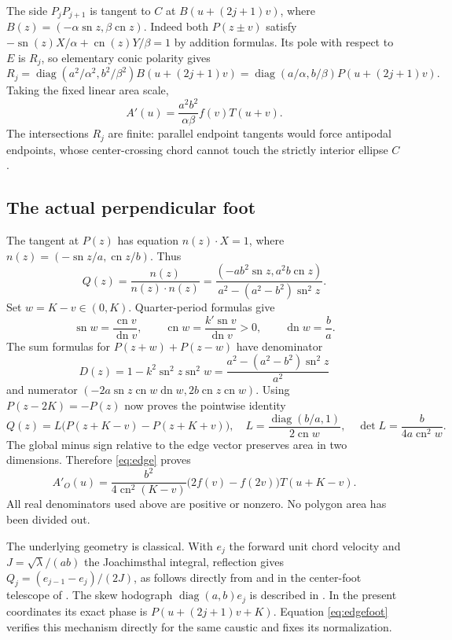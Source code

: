 \documentclass[11pt]{article}
\newcommand{\sn}{\operatorname{sn}}
\newcommand{\cn}{\operatorname{cn}}
\newcommand{\dn}{\operatorname{dn}}
\begin{document}
The side $P_jP_{j+1}$ is tangent to $C$ at
$B(u+(2j+1)v)$, where $B(z)=(-\alpha\sn z,\beta\cn z)$.
Indeed both $P(z\pm v)$ satisfy
$-\sn(z)X/\alpha+\cn(z)Y/\beta=1$ by addition formulas.
Its pole with respect to $E$ is $R_j$, so elementary conic polarity gives
\[
 R_j=\operatorname{diag}(a^2/\alpha^2,b^2/\beta^2)B(u+(2j+1)v)
 =\operatorname{diag}(a/\alpha,b/\beta)P(u+(2j+1)v).
\]
Taking the fixed linear area scale,
\begin{equation}\label{eq:outer}
 A'(u)=\frac{a^2b^2}{\alpha\beta}f(v)T(u+v).
\end{equation}
The intersections $R_j$ are finite: parallel endpoint tangents would force
antipodal endpoints, whose center-crossing chord cannot touch the strictly
interior ellipse $C$.

\subsection*{The actual perpendicular foot}
The tangent at $P(z)$ has equation $n(z)\cdot X=1$, where
$n(z)=(-\sn z/a,\cn z/b)$. Thus
\begin{equation}\label{eq:foot}
 Q(z)=\frac{n(z)}{n(z)\cdot n(z)}
 =\frac{(-ab^2\sn z,a^2b\cn z)}{a^2-(a^2-b^2)\sn^2z}.
\end{equation}
Set $w=K-v\in(0,K)$. Quarter-period formulas give
\[
 \sn w=\frac{\cn v}{\dn v},\qquad
 \cn w=\frac{k'\sn v}{\dn v}>0,\qquad \dn w=\frac ba.
\]
The sum formulas for $P(z+w)+P(z-w)$ have denominator
\[
 D(z)=1-k^2\sn^2z\sn^2w
 =\frac{a^2-(a^2-b^2)\sn^2z}{a^2}
\]
and numerator $(-2a\sn z\cn w\dn w,2b\cn z\cn w)$.
Using $P(z-2K)=-P(z)$ now proves the pointwise identity
\begin{equation}\label{eq:edgefoot}
 Q(z)=L\bigl(P(z+K-v)-P(z+K+v)\bigr),\quad
 L=\frac{\operatorname{diag}(b/a,1)}{2\cn w},\quad
 \det L=\frac{b}{4a\cn^2w}.
\end{equation}
The global minus sign relative to the edge vector preserves area in two
dimensions. Therefore \eqref{eq:edge} proves
\begin{equation}\label{eq:pedal}
 A'_O(u)=\frac{b^2}{4\cn^2(K-v)}
 \bigl(2f(v)-f(2v)\bigr)T(u+K-v).
\end{equation}
All real denominators used above are positive or nonzero. No polygon area
has been divided out.

The underlying geometry is classical. With $e_j$ the forward unit chord
velocity and $J=\sqrt\lambda/(ab)$ the Joachimsthal integral, reflection
gives $Q_j=(e_{j-1}-e_j)/(2J)$, as follows directly from
\cite[proof of Theorem 4]{AST} and in the center-foot telescope of
\cite[Theorem 4.1]{BT}. The skew hodograph
$\operatorname{diag}(a,b)e_j$ is described in
\cite[Lemma 3.1 and Remark 3.2]{AST}. In the present coordinates its exact
phase is $P(u+(2j+1)v+K)$. Equation \eqref{eq:edgefoot} verifies this
mechanism directly for the same caustic and fixes its normalization.
\end{document}
